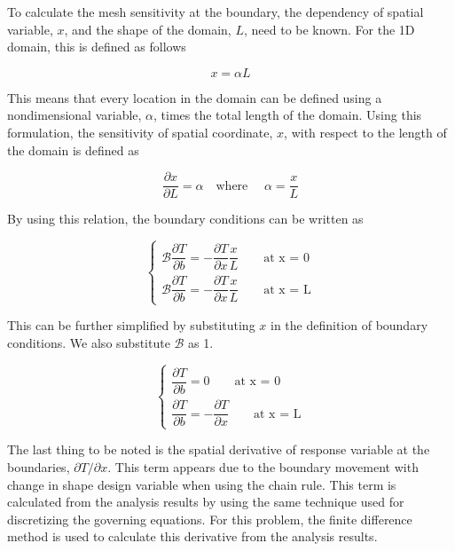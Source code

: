 To calculate the mesh sensitivity at the boundary, the dependency of spatial variable, $x$, and the shape of the domain, $L$, need to be known. For the 1D domain, this is defined as follows

\begin{equation*}
	x = \alpha L
\end{equation*}

This means that every location in the domain can be defined using a nondimensional variable, $\alpha$, times the total length of the domain. Using this formulation, the sensitivity of spatial coordinate, $x$, with respect to the length of the domain is defined as

\begin{equation*}
	\frac{\partial x}{\partial L} = \alpha \quad \text{where } \quad \alpha = \frac{x}{L}
\end{equation*}

By using this relation, the boundary conditions can be written as

\begin{equation*}
\begin{cases}
	\mathcal{B} \dfrac{\partial T}{\partial b} = -\dfrac{\partial T}{\partial x} \dfrac{x}{L} \qquad \text{at x = 0}
	\\
	\mathcal{B} \dfrac{\partial T}{\partial b} = -\dfrac{\partial T}{\partial x} \dfrac{x}{L} \qquad \text{at x = L}
\end{cases}
\end{equation*}

This can be further simplified by substituting $x$ in the definition of boundary conditions. We also substitute $\mathcal{B}$ as 1.

\begin{equation}\label{eq:C2_laplaceSAboundaryCondition}
\begin{cases}
	\dfrac{\partial T}{\partial b} = 0 \qquad \text{at x = 0}
	\\
	\dfrac{\partial T}{\partial b} = -\dfrac{\partial T}{\partial x} \qquad \text{at x = L}
\end{cases}
\end{equation}

The last thing to be noted is the spatial derivative of response variable at the boundaries, $\partial T/\partial x$. This term appears due to the boundary movement with change in shape design variable when using the chain rule. This term is calculated from the analysis results by using the same technique used for discretizing the governing equations. For this problem, the finite difference method is used to calculate this derivative from the analysis results.

